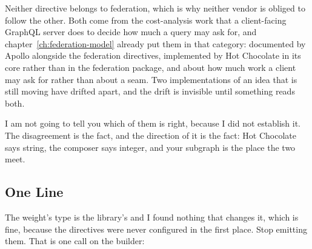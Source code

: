 %
Neither directive belongs to federation, which is why neither vendor is obliged
to follow the other. Both come from the cost-analysis work that a client-facing
GraphQL server does to decide how much a query may ask for, and
chapter~\ref{ch:federation-model} already put them in that category: documented
by Apollo alongside the federation directives, implemented by Hot Chocolate in
its core rather than in the federation package, and about how much work a
client may ask for rather than about a seam. Two implementations of an idea
that is still moving have drifted apart, and the drift is invisible until
something reads both.

%
I am not going to tell you which of them is right, because I did not establish
it. The disagreement is the fact, and the direction of it is the fact: Hot
Chocolate says string, the composer says integer, and your subgraph is the
place the two meet.

\subsection{One Line}

%
The weight's type is the library's and I found nothing that changes it, which
is fine, because the directives were never configured in the first place. Stop
emitting them. That is one call on the builder:

